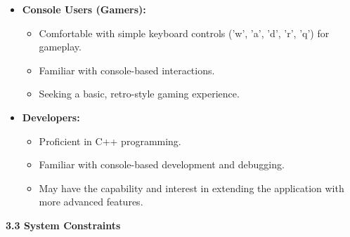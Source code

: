 \documentclass[
]{article}
\begin{document}
\begin{itemize}
\item
  \textbf{Console Users (Gamers):}

  \begin{itemize}
  \item
    Comfortable with simple keyboard controls ('w', 'a', 'd', 'r', 'q')
    for gameplay.
  \item
    Familiar with console-based interactions.
  \item
    Seeking a basic, retro-style gaming experience.
  \end{itemize}
\item
  \textbf{Developers:}

  \begin{itemize}
  \item
    Proficient in C++ programming.
  \item
    Familiar with console-based development and debugging.
  \item
    May have the capability and interest in extending the application
    with more advanced features.
  \end{itemize}
\end{itemize}

\textbf{3.3 System Constraints}
\end{document}

